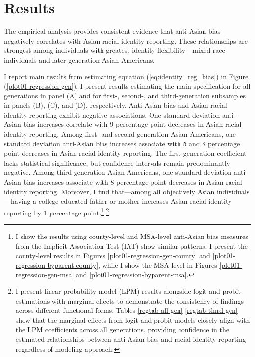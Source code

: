 \section{Results}\label{sec:results}

The empirical analysis provides consistent evidence that anti-Asian bias negatively correlates with Asian racial identity reporting. These relationships are strongest among individuals with greatest identity flexibility—mixed-race individuals and later-generation Asian Americans.

I report main results from estimating equation (\ref{eq:identity_reg_bias}) in Figure (\ref{plot01-regression-gen}). I present results estimating the main specification for all generations in panel (A) and for first-, second-, and third-generation subsamples in panels (B), (C), and (D), respectively. Anti-Asian bias and Asian racial identity reporting exhibit negative associations. One standard deviation anti-Asian bias increases correlate with 9 percentage point decreases in Asian racial identity reporting. Among first- and second-generation Asian Americans, one standard deviation anti-Asian bias increases associate with 5 and 8 percentage point decreases in Asian racial identity reporting. The first-generation coefficient lacks statistical significance, but confidence intervals remain predominantly negative. Among third-generation Asian Americans, one standard deviation anti-Asian bias increases associate with 8 percentage point decreases in Asian racial identity reporting. Moreover, I find that---among all objectively Asian individuals---having a college-educated father or mother increases Asian racial identity reporting by 1 percentage point.\footnote{I show the results using county-level and MSA-level anti-Asian bias measures from the Implicit Association Test (IAT) show similar patterns. I present the county-level results in Figures \ref{plot01-regression-gen-county} and \ref{plot01-regression-byparent-county}, while I show the MSA-level in Figures \ref{plot01-regression-gen-msa} and \ref{plot01-regression-byparent-msa}.} \footnote{I present linear probability model (LPM) results alongside logit and probit estimations with marginal effects to demonstrate the consistency of findings across different functional forms. Tables \ref{regtab-all-gen}-\ref{regtab-third-gen} show that the marginal effects from logit and probit models closely align with the LPM coefficients across all generations, providing confidence in the estimated relationships between anti-Asian bias and racial identity reporting regardless of modeling approach.}

